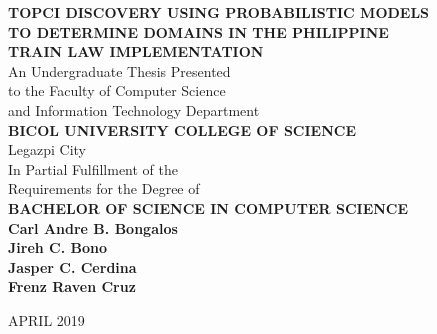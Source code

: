 \begin{center}
	
	\textbf{TOPCI DISCOVERY USING PROBABILISTIC MODELS\\ TO DETERMINE DOMAINS IN THE PHILIPPINE\\TRAIN LAW IMPLEMENTATION
	}\\
	[17ex]

	
	{An Undergraduate Thesis Presented \\
		to the Faculty of Computer Science \\
		and Information Technology Department \\
		\textbf{BICOL UNIVERSITY COLLEGE OF SCIENCE} \\
		Legazpi City} \\[17ex]
	
	{In Partial Fulfillment of the \\
		Requirements for the Degree of \\
		\textbf{BACHELOR OF SCIENCE IN COMPUTER SCIENCE}} \\[16ex]
	
	
	\textbf{\normalsize 
		Carl Andre B. Bongalos \\
		Jireh C. Bono \\ 
		Jasper C. Cerdina \\
		Frenz Raven Cruz \\[16ex]}
	
	APRIL 2019
	
	
	
	\thispagestyle{empty}
	
\end{center}